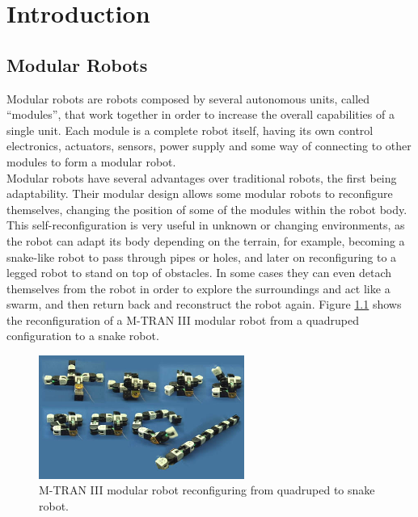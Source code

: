 \chapter{Introduction}
\label{introduction}

\section{Modular Robots}
\label{introduction_intro}

Modular robots are robots composed by several autonomous units, called ``modules'', that work together in order to increase the overall capabilities of a single unit. Each module is a complete robot itself, having its own control electronics, actuators, sensors, power supply and some way of connecting to other modules to form a modular robot.\\

Modular robots have several advantages over traditional robots, the first being adaptability. Their modular design allows some modular robots to reconfigure themselves, changing the position of some of the modules within the robot body. This self-reconfiguration is very useful in unknown or changing environments, as the robot can adapt its body depending on the terrain, for example, becoming a snake-like robot to pass through pipes or holes, and later on reconfiguring to a legged robot to stand on top of obstacles. 
In some cases they can even detach themselves from the robot in order to explore the surroundings and act like a swarm, and then return back and reconstruct the robot again. Figure \ref{fig:intro_mtran3} shows the reconfiguration of a M-TRAN III modular robot from a quadruped configuration to a snake robot.\\

\begin{figure}[h]
		\centering
        \includegraphics[width=0.6\textwidth]{images/Intro_mtran3.jpg}
        \caption{M-TRAN III modular robot reconfiguring from quadruped to snake robot.}
        \label{fig:intro_mtran3}
\end{figure} 


